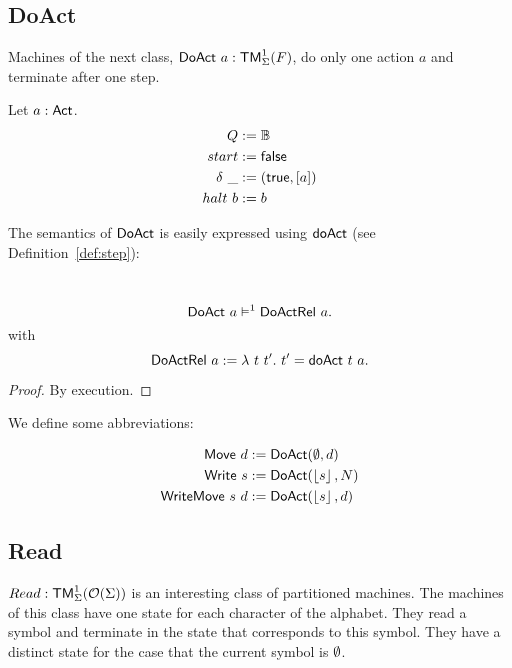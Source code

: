 \subsection{DoAct}
\label{sec:DoAct}

Machines of the next class, $\textsf{DoAct}~a : \textsf{TM}_\Sigma^1(F)$, do only one action $a$ and terminate after one step.
\begin{definition}[$\MS{DoAct}~a$]
  \label{def:DoAct}
  Let $a:\textsf{Act}$.
  \begin{align*}
    Q          &:= \mathbb{B} \\
    start      &:= \textsf{false} \\
    \delta ~\_ &:= (\textsf{true}, \left[ a \right]) \\
    halt   ~ b &:= b \\
  \end{align*}
\end{definition}
The semantics of $\textsf{DoAct}$ is easily expressed using $\textsf{doAct}$ (see Definition~\ref{def:step}):
\begin{lemma}
  \label{lem:tam}
  ~
  \[
    \textsf{DoAct}~a \vDash^1 \textsf{DoActRel}~a.
  \]
  with
  \[
    \textsf{DoActRel}~a := \lambda~t~t'.~ t' = \textsf{doAct}~t~a.
  \]
\end{lemma}
\begin{proof}
  By execution.
\end{proof}


We define some abbreviations:

\begin{definition}
 \label{def:DoAct-derived} 

 \begin{align*}
   \textsf{Move}       ~d &:= \textsf{DoAct} (\emptyset, d) \\
   \textsf{Write}    ~s   &:= \textsf{DoAct} (\left\lfloor {s} \right\rfloor, N) \\
   \textsf{WriteMove}~s~d &:= \textsf{DoAct} (\left\lfloor {s} \right\rfloor, d)
 \end{align*}
 
\end{definition}



\subsection{Read}
\label{sec:basic_machines-Read}

$Read : \textsf{TM}_\Sigma^1(\mathcal{O}(\Sigma))$ is an interesting class of partitioned machines.  The machines of this class have one state for each character
of the alphabet.  They read a symbol and terminate in the state that corresponds to this symbol.  They have a distinct state for the case that the
current symbol is $\emptyset$.



